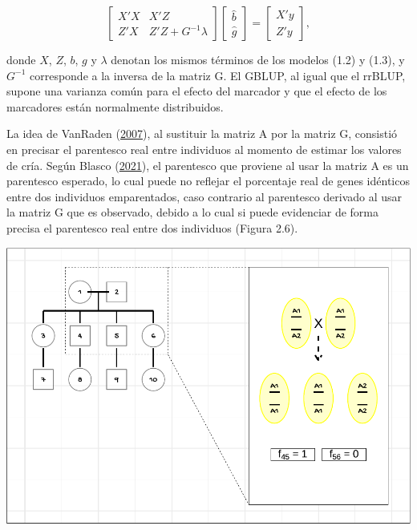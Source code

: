 \documentclass[11pt,spanish,a4paper,oneside,]{book} %
\begin{document}
\begin{equation}
\begin{bmatrix}
X'X & X'Z \\
Z'X & Z'Z + G^{-1} \lambda
\end{bmatrix}
\begin{bmatrix}
\hat{b} \\
\hat{g}
\end{bmatrix}
=
\begin{bmatrix}
X'y \\
Z'y
\end{bmatrix}
,
\end{equation}

donde \(X\), \(Z\), \(b\), \(g\) y \(\lambda\) denotan los mismos términos de los modelos (1.2) y (1.3), y \(G^{-1}\) corresponde a la inversa de la matriz G. El GBLUP, al igual que el rrBLUP, supone una varianza común para el efecto del marcador y que el efecto de los marcadores están normalmente distribuidos.

La idea de VanRaden (\protect\hyperlink{ref-cite:39}{2007}), al sustituir la matriz A por la matriz G, consistió en precisar el parentesco real entre individuos al momento de estimar los valores de cría. Según Blasco (\protect\hyperlink{ref-cite:21}{2021}), el parentesco que proviene al usar la matriz A es un parentesco esperado, lo cual puede no reflejar el porcentaje real de genes idénticos entre dos individuos emparentados, caso contrario al parentesco derivado al usar la matriz G que es observado, debido a lo cual si puede evidenciar de forma precisa el parentesco real entre dos individuos (Figura 2.6).

\begin{center}\includegraphics[width=1\linewidth]{figures/Ped} \end{center}
\end{document}
